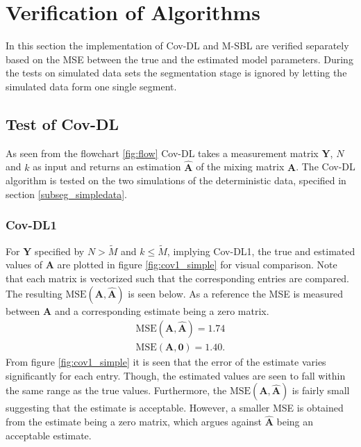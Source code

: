 \section{Verification of Algorithms}
In this section the implementation of Cov-DL and M-SBL are verified separately based on the MSE between the true and the estimated model parameters.
During the tests on simulated data sets the segmentation stage is ignored by letting the simulated data form one single segment.    

\subsection{Test of Cov-DL}
As seen from the flowchart \ref{fig:flow} Cov-DL takes a measurement matrix $\mathbf{Y}$, $N$ and $k$ as input and returns an estimation $\hat{\mathbf{A}}$ of the mixing matrix $\mathbf{A}$. 
The Cov-DL algorithm is tested on the two simulations of the deterministic data, specified in section \ref{subseg_simpledata}. 

\subsubsection{Cov-DL1}
For $\mathbf{Y}$ specified by $N > \widetilde{M}$ and $k \leq \widetilde{M}$, implying Cov-DL1, the true and estimated values of $\mathbf{A}$ are plotted in figure \ref{fig:cov1_simple} for visual comparison. 
Note that each matrix is vectorized such that the corresponding entries are compared.  
The resulting $\text{MSE}(\mathbf{A}, \hat{\mathbf{A}})$ is seen below. As a reference the MSE is measured between $\mathbf{A}$ and a corresponding estimate being a zero matrix.   
\begin{align*}
\text{MSE}(\mathbf{A}, \hat{\mathbf{A}}) = 1.74 \\
\text{MSE}(\mathbf{A}, \mathbf{0}) = 1.40.
\end{align*}
From figure \ref{fig:cov1_simple} it is seen that the error of the estimate varies significantly for each entry. 
Though, the estimated values are seen to fall within the same range as the true values.
Furthermore, the $\text{MSE}(\mathbf{A}, \hat{\mathbf{A}})$ is fairly small suggesting that the estimate is acceptable. However, a smaller MSE is obtained from the estimate being a zero matrix, which argues against $\hat{\mathbf{A}}$ being an acceptable estimate. 


